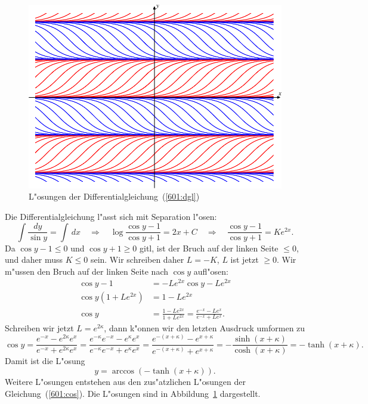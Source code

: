 \begin{diskussion}
\begin{figure}
\centering
\includegraphics{../skript/uebungsaufgaben/601-1.pdf}
\caption{L"osungen der Differentialgleichung~(\ref{601:dgl})
\label{601:bild}}
\end{figure}
Die Differentialgleichung l"asst sich mit Separation l"osen:
\[
\int \frac{dy}{\sin y}
=
\int\,dx
\quad\Rightarrow\quad
\log\frac{\cos y-1}{\cos y+1}
=
2x+C
\quad\Rightarrow\quad
\frac{\cos y-1}{\cos y+1}
=
Ke^{2x}.
\]
Da $\cos y-1\le 0$ und $\cos y +1\ge 0$ gitl, ist der Bruch auf der linken
Seite $\le 0$, und daher muss $K\le 0$ sein.
Wir schreiben daher $L=-K$, $L$ ist jetzt $\ge 0$.
Wir m"ussen den Bruch auf der linken Seite nach $\cos y$ aufl"osen:
\begin{align*}
\cos y - 1 &=-Le^{2x}\cos y -Le^{2x}
\\
\cos y(1+Le^{2x})
&=
1-Le^{2x}
\\
\cos y
&=
\frac{1-Le^{2x}}{1+Le^{2x}}
=
\frac{e^{-x}-Le^{x}}{e^{-x}+Le^x}.
\end{align*}
Schreiben wir jetzt $L=e^{2\kappa}$, dann k"onnen wir den letzten
Ausdruck umformen zu
\begin{equation}
\cos y
=
\frac{e^{-x}-e^{2\kappa}e^x}{e^{-x}+e^{2\kappa}e^x}
=
\frac{e^{-\kappa}e^{-x}-e^{\kappa}e^x}{e^{-\kappa}e^{-x}+e^{\kappa}e^x}
=
\frac{e^{-(x+\kappa)}-e^{x+\kappa}}{e^{-(x+\kappa)}+e^{x + \kappa}}
=
-\frac{\sinh(x+\kappa)}{\cosh(x+\kappa)}
=
-\tanh(x+\kappa).
\label{601:cos}
\end{equation}
Damit ist die L"osung
\[
y=\arccos(-\tanh(x+\kappa)).
\]
Weitere L"osungen entstehen aus den zus"atzlichen L"osungen der
Gleichung~(\ref{601:cos}).
Die L"osungen sind in Abbildung~\ref{601:bild} dargestellt.
\end{diskussion}

